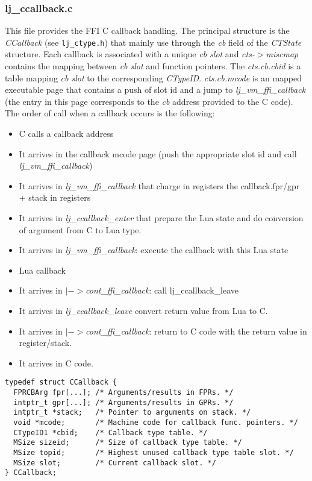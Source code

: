 \subsubsection{lj\_ccallback.c}
This file provides the FFI C callback handling. The principal structure is the
\emph{CCallback} (see \texttt{lj\_ctype.h}) that mainly use through the \textit{cb} field
of the \emph{CTState}
structure. Each callback is associated with a unique \textit{cb slot} and
\emph{cts-$>$miscmap} contains the mapping between \textit{cb slot} and function
pointers. The \emph{cts.cb.cbid} is a table mapping \textit{cb slot} to the corresponding
\textit{CTypeID}. \emph{cts.cb.mcode} is an mapped executable page that contains a push
of slot id and a jump to \emph{lj\_vm\_ffi\_callback} (the entry in this page
corresponds to the \textit{cb} address provided to the C code). The order of call when a callback occurs is the following:

\begin{itemize}
	\item C calls a callback address
	\item It arrives in the callback mcode page (push the appropriate slot id and call \textit{lj\_vm\_ffi\_callback})
	\item It arrives in \textit{lj\_vm\_ffi\_callback} that charge in registers the callback.fpr/gpr + stack in registers
	\item It arrives in \textit{lj\_ccallback\_enter} that prepare the Lua state and do conversion of argument from C to Lua type.
	\item It arrives in \textit{lj\_vm\_ffi\_callback}: execute the callback with this Lua state
	\item Lua callback
	\item It arrives in\textit{ $|->$cont\_ffi\_callback}: call lj\_ccallback\_leave
	\item It arrives in \textit{lj\_ccallback\_leave} convert return value from Lua to C.
	\item It arrives in\textit{ $|->$cont\_ffi\_callback}: return to C code with the return value in register/stack.
	\item It arrives in C code.
\end{itemize}

\begin{lstlisting}[style=CStyle]
typedef struct CCallback {
  FPRCBArg fpr[...]; /* Arguments/results in FPRs. */
  intptr_t gpr[...]; /* Arguments/results in GPRs. */
  intptr_t *stack;   /* Pointer to arguments on stack. */
  void *mcode;       /* Machine code for callback func. pointers. */
  CTypeID1 *cbid;    /* Callback type table. */
  MSize sizeid;      /* Size of callback type table. */
  MSize topid;       /* Highest unused callback type table slot. */
  MSize slot;        /* Current callback slot. */
} CCallback;
\end{lstlisting}

